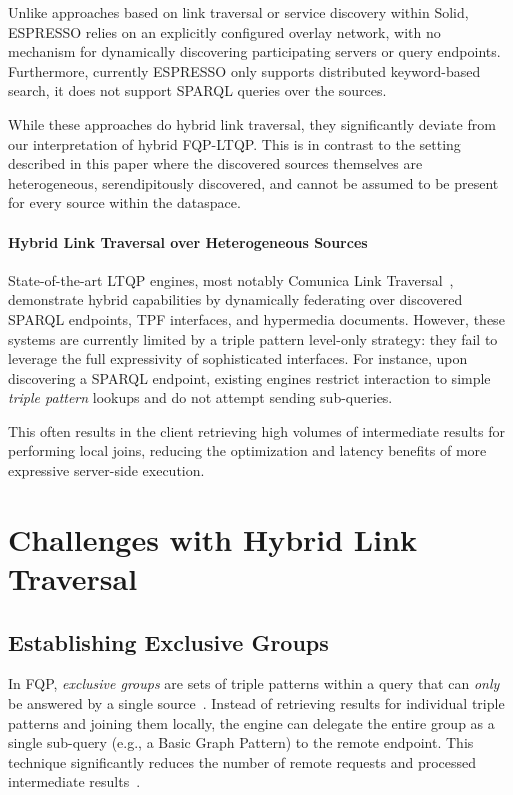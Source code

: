 \documentclass{ceurart}
\theoremstyle{definition}
\begin{document}
Unlike approaches based on link traversal or service discovery within Solid, 
ESPRESSO relies on an explicitly configured overlay network, 
with no mechanism for dynamically discovering participating servers or query endpoints.
Furthermore, currently ESPRESSO only supports distributed keyword-based search, it does not support SPARQL queries over the sources.

While these approaches do hybrid link traversal, they significantly deviate from our interpretation of hybrid FQP-LTQP.
This is in contrast to the setting described in this paper where the discovered sources themselves are heterogeneous, serendipitously discovered, 
and cannot be assumed to be present for every source within the dataspace. 
\paragraph{Hybrid Link Traversal over Heterogeneous Sources} State-of-the-art LTQP engines, 
most notably Comunica Link Traversal~\cite{taelman2018comunica, taelman2023link},
demonstrate hybrid capabilities by dynamically federating 
over discovered SPARQL endpoints, TPF interfaces, and hypermedia documents.
However, these systems are currently limited by a triple pattern level-only strategy: they fail
to leverage the full expressivity of sophisticated interfaces.
For instance, upon discovering a SPARQL endpoint, existing engines restrict interaction to simple \emph{triple pattern} lookups and do not attempt 
sending sub-queries.

This often results in the client retrieving high volumes of intermediate results for performing local joins,
reducing the optimization and latency benefits of more expressive server-side execution.

\section{Challenges with Hybrid Link Traversal}

\subsection{Establishing Exclusive Groups}

In FQP, \emph{exclusive groups} are sets of triple patterns within a query
that can \emph{only} be answered by a single source~\cite{schwarte2011fedx}. 
Instead of retrieving results for individual triple patterns and joining them locally,
the engine can delegate the entire group as a single sub-query (e.g., a Basic Graph Pattern) to the remote endpoint. 
This technique significantly reduces the number of remote requests and processed intermediate results~\cite{aimonier2024fedup,schwarte2011fedx}.
\end{document}
